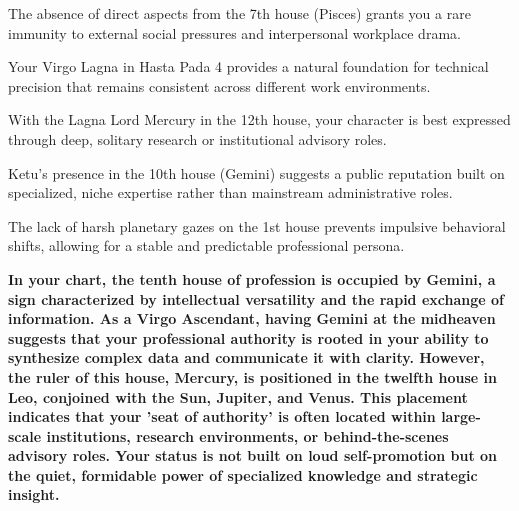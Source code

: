 \begin{diamondlist}
  \item {\fontsize{8.5}{12}\selectfont The absence of direct aspects from the 7th house (Pisces) grants you a rare immunity to external social pressures and interpersonal workplace drama.}
  \item {\fontsize{8.5}{12}\selectfont Your Virgo Lagna in Hasta Pada 4 provides a natural foundation for technical precision that remains consistent across different work environments.}
  \item {\fontsize{8.5}{12}\selectfont With the Lagna Lord Mercury in the 12th house, your character is best expressed through deep, solitary research or institutional advisory roles.}
  \item {\fontsize{8.5}{12}\selectfont Ketu's presence in the 10th house (Gemini) suggests a public reputation built on specialized, niche expertise rather than mainstream administrative roles.}
  \item {\fontsize{8.5}{12}\selectfont The lack of harsh planetary gazes on the 1st house prevents impulsive behavioral shifts, allowing for a stable and predictable professional persona.}
\end{diamondlist}


\label{topic11}

{\fontsize{9.5}{13.8}\selectfont\bfseries\color{DeepSlate} In your chart, the tenth house of profession is occupied by Gemini, a sign characterized by intellectual versatility and the rapid exchange of information. As a Virgo Ascendant, having Gemini at the midheaven suggests that your professional authority is rooted in your ability to synthesize complex data and communicate it with clarity. However, the ruler of this house, Mercury, is positioned in the twelfth house in Leo, conjoined with the Sun, Jupiter, and Venus. This placement indicates that your 'seat of authority' is often located within large-scale institutions, research environments, or behind-the-scenes advisory roles. Your status is not built on loud self-promotion but on the quiet, formidable power of specialized knowledge and strategic insight.}\par\vspace{2mm}

